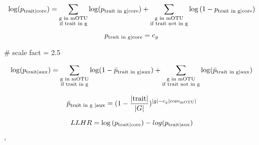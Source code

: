 
$$\log(p_{\textrm{trait\textbar core}})=\sum_{\substack{\textrm{g in mOTU}\\ \textrm{if trait in g}}} \log({p_{\textrm{trait in g\textbar core}}}) + \sum_{\substack{\textrm{g in mOTU}\\ \textrm{if trait not in g}}}\log{(1-p_{\textrm{trait in g\textbar  core}})}$$

$$p_{\textrm{trait in g\textbar core}}=c_g$$


# scale fact = 2.5

$$\log(p_{\textrm{trait\textbar aux}})=\sum_{\substack{\textrm{g in mOTU}\\ \textrm{if trait in g}}} \log(1-\bar{p}_{\textrm{trait in g\textbar aux}}) + \sum_{\substack{\textrm{g in mOTU}\\ \textrm{if trait not in g}}} \log(\bar{p}_{\textrm{trait in g\textbar aux}})$$


$$\bar{p}_{\textrm{trait in g \textbar aux}}=(1-\frac{| \textrm{trait}| }{| G| })^{| g| -c_g| \textrm{core}_{\textrm{mOTU}}| }$$

$$LLHR=\log{(p_{\textrm{trait\textbar core}})}-log{(p_{\textrm{trait\textbar aux}})}$$,
